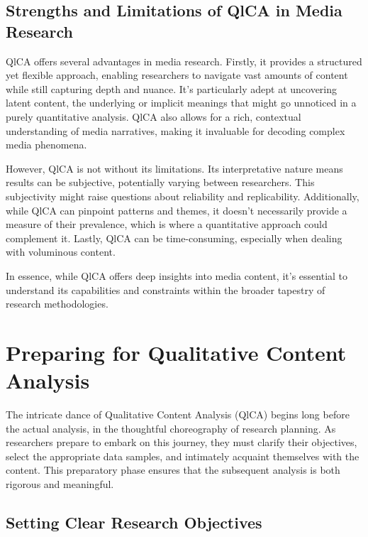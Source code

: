 \documentclass[
  b5paper]{book}
\begin{document}
\hypertarget{strengths-and-limitations-of-qlca-in-media-research}{%
\subsection*{Strengths and Limitations of QlCA in Media Research}\label{strengths-and-limitations-of-qlca-in-media-research}}

QlCA offers several advantages in media research. Firstly, it provides a structured yet flexible approach, enabling researchers to navigate vast amounts of content while still capturing depth and nuance. It's particularly adept at uncovering latent content, the underlying or implicit meanings that might go unnoticed in a purely quantitative analysis. QlCA also allows for a rich, contextual understanding of media narratives, making it invaluable for decoding complex media phenomena.

However, QlCA is not without its limitations. Its interpretative nature means results can be subjective, potentially varying between researchers. This subjectivity might raise questions about reliability and replicability. Additionally, while QlCA can pinpoint patterns and themes, it doesn't necessarily provide a measure of their prevalence, which is where a quantitative approach could complement it. Lastly, QlCA can be time-consuming, especially when dealing with voluminous content.

In essence, while QlCA offers deep insights into media content, it's essential to understand its capabilities and constraints within the broader tapestry of research methodologies.

\hypertarget{preparing-for-qualitative-content-analysis}{%
\section{Preparing for Qualitative Content Analysis}\label{preparing-for-qualitative-content-analysis}}

The intricate dance of Qualitative Content Analysis (QlCA) begins long before the actual analysis, in the thoughtful choreography of research planning. As researchers prepare to embark on this journey, they must clarify their objectives, select the appropriate data samples, and intimately acquaint themselves with the content. This preparatory phase ensures that the subsequent analysis is both rigorous and meaningful.

\hypertarget{setting-clear-research-objectives}{%
\subsection*{Setting Clear Research Objectives}\label{setting-clear-research-objectives}}
\end{document}
